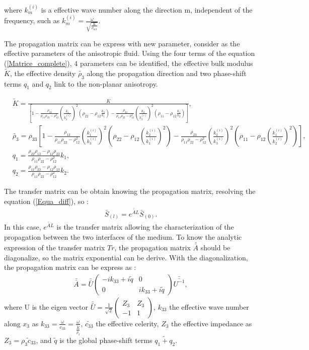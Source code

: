 \documentclass{article}
\begin{document}
    where $k_m^{(i)}$ is a effective wave number along the direction m, independent of the frequency, such as $k_m^{(i)}=\frac{\omega}{\sqrt{\frac{K}{\rho_{m3}}}}$.
    
    The propagation matrix can be express with new parameter, consider as the effective parameters of the anisotropic fluid. Using the four terms of the equation (\ref{Matrice_complete}), 4 parameters can be identified, the effective bulk modulus $\tilde{K}$, the effective density $\tilde{\rho_3}$ along the propagation direction and two phase-shift terms $q_1$ and $q_2$ link to the non-planar anisotropy.
    
    \begin{align}
     &\tilde{K}=\frac{K}{[1-\frac{\rho_{33}}{\rho_{11}\rho_{22}-\rho_{12}^2}(\frac{k_1}{k_3^{(i)}})^2(\rho_{22}-\rho_{12}\frac{k_2}{k_1})-\frac{\rho_{33}}{\rho_{11}\rho_{22}-\rho_{12}^2}(\frac{k_2}{k_3^{(i)}})^2(\rho_{11}-\rho_{12}\frac{k_1}{k_2})]}\label{Ktild},\\
     &\tilde{\rho_3}=\rho_{33}[1-\frac{\rho_{13}}{\rho_{11}\rho_{22}-\rho_{12}^2}(\frac{k_1^{(i)}}{k_3^{(i)}})^2(\rho_{22}-\rho_{12}(\frac{k_2^{(i)}}{k_1^{(i)}})^2)-\frac{\rho_{23}}{\rho_{11}\rho_{22}-\rho_{12}^2}(\frac{k_2^{(i)}}{k_3^{(i)}})^2(\rho_{11}-\rho_{12}(\frac{k_1^{(i)}}{k_2^{(i)}})^2)]\label{rho3tild}, \\
	&q_{1}=\frac{\rho_{22}\rho_{13}-\rho_{12}\rho_{23}}{\rho_{11}\rho_{22}-\rho_{12}^2}k_1\label{q1},\\
    &q_{2}= \frac{\rho_{11}\rho_{23}-\rho_{12}\rho_{13}}{\rho_{11}\rho_{22}-\rho_{12}^2}k_2\label{q2}.
          \end{align}
          
    The transfer matrix can be obtain knowing the propagation matrix, resolving the equation (\ref{Equa_diff}), so :
    \begin{align}
    \bar{S}_{(l)}=e^{\bar{\bar{A}}L}\bar{S}_{(0)}.\label{PB}
    \end{align}
    In this case, $e^{\bar{\bar{A}}L}$ is the transfer matrix allowing the characterization of the propagation between the two interfaces of the medium.
    To know the analytic expression of the transfer matrix $Tr$, the propagation matrix $\bar{\bar{A}}$ should be diagonalize, so the matrix exponential can be derive.
    With the diagonalization, the propagation matrix can be express as :
     \begin{align}
    \bar{\bar{A}}=\bar{\bar{U}} \begin{pmatrix}
    								-ik_{33}+i\tilde{q} & 0 \\ 0 & ik_{33}+i\tilde{q} 
    							\end{pmatrix} \bar{\bar{U^{-1}}},
    \end{align}
    where U is the eigen vector $\bar{\bar{U}}=\frac{1}{\sqrt{2}}\begin{pmatrix} Z_3 & Z_3 \\ -1 & 1 \end{pmatrix}$, $k_{33}$ the effective wave number along $x_3$ as $k_{33}=\frac{\omega}{c_{33}}=\frac{\omega}{\frac{\tilde{K}}{\tilde{\rho_3}}}$, $\tilde{c_{33}}$ the effective celerity, $Z_3$ the effective impedance as $Z_3=\tilde{\rho_3c_{33}}$, and $\tilde{q}$ is the global phase-shift terms $\tilde{q_1+q_2}$.
    
\end{document}
